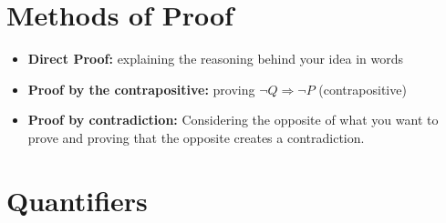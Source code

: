 \documentclass{report}
\begin{document}
	\section{Methods of Proof}
		\begin{itemize}\addtolength{\leftskip}{2em}
			\item \textbf{Direct Proof:} explaining the reasoning behind your idea in words
			\item \textbf{Proof by the contrapositive:} proving $\neg Q \Rightarrow \neg P$ (contrapositive)
			\item \textbf{Proof by contradiction:} Considering the opposite of what you want to prove and proving that the opposite creates a contradiction. 
		\end{itemize}
	\section{Quantifiers}
\end{document}
